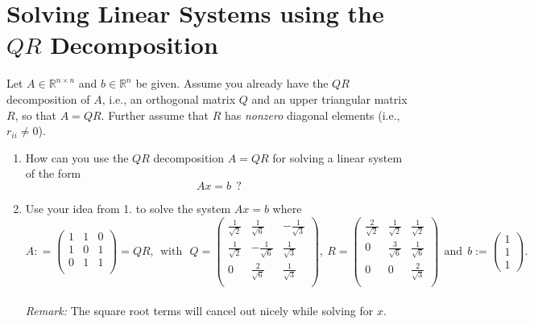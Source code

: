 \section{Solving Linear Systems using the $QR$ Decomposition}
Let $A \in \mathbb{R}^{n \times n}$ and $b\in\mathbb{R}^{n}$ be given. Assume you already have the $QR$ decomposition of $A$, i.e., an orthogonal matrix $Q$ and an upper triangular matrix $R$, so that $A = QR$. Further assume that $R$ has \textit{nonzero} diagonal elements (i.e., $r_{ii}\neq 0$).
\begin{enumerate}
	\item How can you use the $QR$ decomposition $A = QR$ for solving a linear system of the form
	$$Ax = b~~ ?$$
	\item Use your idea from 1. to solve the system $Ax = b$ where
	$$A: =
	\begin{pmatrix}
		1 & 1 & 0 \\
	    1 & 0 & 1 \\
		0 & 1 & 1 \\
	\end{pmatrix} = QR,~~ \text{with}~~~
	Q=
	\begin{pmatrix}
	\frac{1}{\sqrt{2}} &\frac{1}{\sqrt{6}} & -\frac{1}{\sqrt{3}} \\
	\frac{1}{\sqrt{2}} & -\frac{1}{\sqrt{6}} & \frac{1}{\sqrt{3}}\\
	0 & \frac{2}{\sqrt{6}} & \frac{1}{\sqrt{3}} \\
	\end{pmatrix},~
	R =
	\begin{pmatrix}
	\frac{2}{\sqrt{2}} & \frac{1}{\sqrt{2}} & \frac{1}{\sqrt{2}} \\
	0 & \frac{3}{\sqrt{6}} & \frac{1}{\sqrt{6}} \\
	0 & 0 & \frac{2}{\sqrt{3}} \\
	\end{pmatrix}~~\text{and}~
	~b := \begin{pmatrix}
	1 \\ 1\\1
\end{pmatrix} .	$$
~\\
\textit{Remark:} The square root terms will cancel out nicely while solving for $x$.
\end{enumerate}